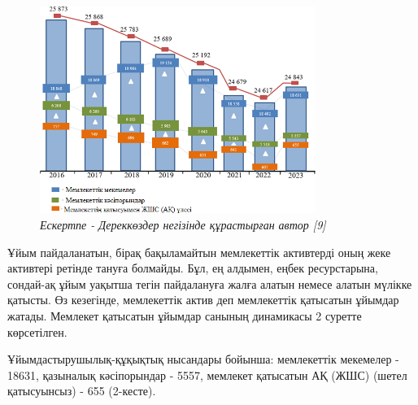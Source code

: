 \begin{figure}[H]
	\centering
	\includegraphics[width=0.8\textwidth]{media/ekon2/image2}
	\caption*{2 - сурет. Мемлекет қатысатын ұйымдар санының динамикасы}
	\caption*{\normalfont \emph{Ескертпе - Дереккөздер негізінде құрастырған автор {[}9{]}}}
\end{figure}

\begin{multicols}{2}
Ұйым пайдаланатын, бірақ бақыламайтын мемлекеттік активтерді оның жеке
активтері ретінде тануға болмайды. Бұл, ең алдымен, еңбек ресурстарына,
сондай-ақ ұйым уақытша тегін пайдалануға жалға алатын немесе алатын
мүлікке қатысты. Өз кезегінде, мемлекеттік актив деп мемлекеттік
қатысатын ұйымдар жатады. Мемлекет қатысатын ұйымдар санының динамикасы
2 суретте көрсетілген.

Ұйымдастырушылық-құқықтық нысандары бойынша: мемлекеттік мекемелер -
18631, қазыналық кәсіпорындар - 5557, мемлекет қатысатын АҚ (ЖШС) (шетел
қатысуынсыз) - 655 (2-кесте).
\end{multicols}

